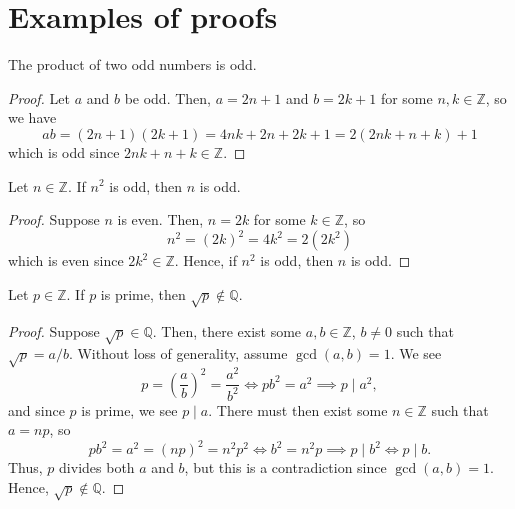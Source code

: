 \section{Examples of proofs}

\begin{claim}
The product of two odd numbers is odd.
\end{claim}
\begin{proof}
Let $ a $ and $ b $ be odd. Then, $ a=2n+1 $ and $ b=2k+1 $ for some $ n,k\in\mathbb{Z} $, so we have
\begin{equation*}
    ab=(2n+1)(2k+1)=4nk+2n+2k+1=2(2nk+n+k)+1
\end{equation*}
which is odd since $ 2nk+n+k\in\mathbb{Z} $.
\end{proof}

\begin{claim}
Let $ n\in\mathbb{Z} $. If $ n^2 $ is odd, then $ n $ is odd.
\end{claim}
\begin{proof}
Suppose $ n $ is even. Then, $ n=2k $ for some $ k\in\mathbb{Z} $, so
\begin{equation*}
    n^2=(2k)^2=4k^2=2(2k^2)
\end{equation*}
which is even since $ 2k^2\in\mathbb{Z} $. Hence, if $ n^2 $ is odd, then $ n $ is odd.
\end{proof}

\begin{claim}
Let $ p\in\mathbb{Z} $. If $ p $ is prime, then $ \sqrt{p}\notin\mathbb{Q} $.
\end{claim}
\begin{proof}
Suppose $ \sqrt{p}\in\mathbb{Q} $. Then, there exist some $ a,b\in\mathbb{Z} $, $ b\neq 0 $ such that $ \sqrt{p}=a/b $. Without loss of generality, assume $ \gcd(a,b)=1 $. We see
\begin{equation*}
    p=\left(\frac{a}{b}\right)^2=\frac{a^2}{b^2} \iff pb^2=a^2 \implies p\mid a^2,
\end{equation*}
and since $ p $ is prime, we see $ p\mid a $. There must then exist some $ n\in\mathbb{Z} $ such that $ a=np $, so
\begin{equation*}
    pb^2=a^2=(np)^2=n^2p^2 \iff b^2=n^2p \implies p\mid b^2 \iff p\mid b.
\end{equation*}
Thus, $ p $ divides both $ a $ and $ b $, but this is a contradiction since $ \gcd(a,b)=1 $. Hence, $ \sqrt{p}\notin\mathbb{Q} $.
\end{proof}

